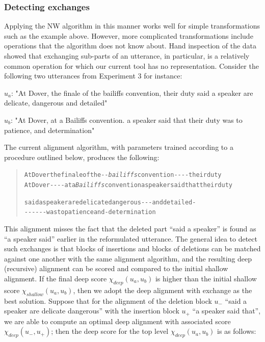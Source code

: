 \subsubsection{Detecting exchanges}\label{detecting-exchanges}

Applying the NW algorithm in this manner works well for simple
transformations such as the example above. However, more complicated
transformations include operations that the algorithm does not know
about. Hand inspection of the data showed that exchanging sub-parts of
an utterance, in particular, is a relatively common operation for which
our current tool has no representation. Consider the following two
utterances from Experiment 3 for instance:

\begin{nquote} %
  $u_a$: "At Dover, the finale of the bailiffs convention, their duty said a speaker are delicate, dangerous and detailed" \label{ut:49}
\end{nquote}\begin{nquote} %
  $u_b$: "At Dover, at a Bailiffs convention. a speaker said that their duty was to patience, and determination" \label{ut:120}
\end{nquote}

The current alignment algorithm, with parameters trained according to a
procedure outlined below, produces the following:

\begin{quote}\begin{alltt}\small
At Dover \textcolor{BrickRed}{the finale of the} -  - \emph{\textcolor{Sepia}{bailiffs}} convention - -       -    -    their duty
At Dover -   -      -  -   \textcolor{OliveGreen}{at a} \emph{\textcolor{Sepia}{Bailiffs}} convention \textcolor{OliveGreen}{a speaker said that} their duty

\textcolor{BrickRed}{said a speaker are delicate dangerous} -   -  -        and \textcolor{BrickRed}{detailed} -            
-    - -       -   -        -         \textcolor{OliveGreen}{was to patience} and -         \textcolor{OliveGreen}{determination}
\end{alltt}\end{quote}

This alignment misses the fact that the deleted part \enquote{said a
speaker} is found as \enquote{a speaker said} earlier in the
reformulated utterance. The general idea to detect such exchanges is
that blocks of insertions and blocks of deletions can be matched against
one another with the same alignment algorithm, and the resulting deep
(recursive) alignment can be scored and compared to the initial shallow
alignment. If the final deep score \(\chi_{deep}(u_a, u_b)\) is higher
than the initial shallow score \(\chi_{shallow}(u_a, u_b)\), then we
adopt the deep alignment with exchange as the best solution. Suppose
that for the alignment of the deletion block \(u_-\) \enquote{said a
speaker are delicate dangerous} with the insertion block \(u_+\)
\enquote{a speaker said that}, we are able to compute an optimal deep
alignment with associated score \(\chi_{deep}(u_-, u_+)\); then the deep
score for the top level \(\chi_{deep}(u_a, u_b)\) is as follows:

